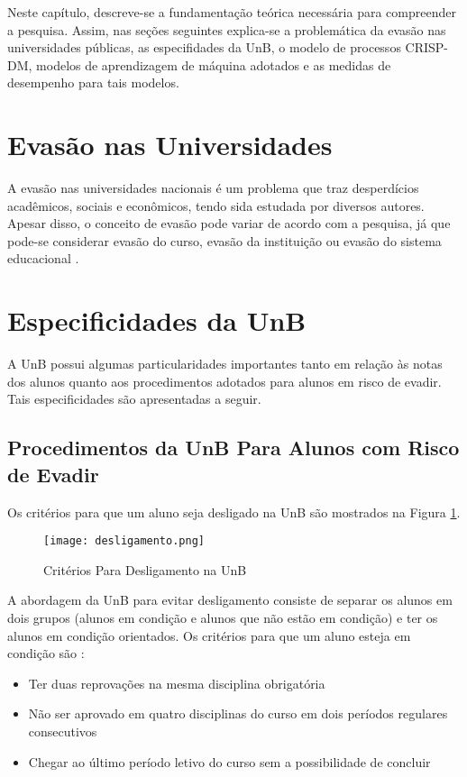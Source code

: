 Neste capítulo, descreve-se a fundamentação teórica necessária para compreender a
pesquisa. Assim, nas seções seguintes explica-se a problemática da evasão nas universidades
públicas, as especifidades da \acrshort{UnB}, o modelo de processos CRISP-DM, modelos
de aprendizagem de máquina adotados e as medidas de desempenho para tais modelos. 

\section{Evasão nas Universidades} 
A evasão nas universidades nacionais é um problema que traz desperdícios acadêmicos,
sociais e econômicos, tendo sida estudada por diversos autores. Apesar disso, o
conceito de evasão pode variar  de acordo com a pesquisa,
já que pode-se considerar evasão do curso, evasão da instituição ou evasão do
sistema educacional \cite{mec_conceito_evasao}. 

\section{Especificidades da UnB}
A UnB possui algumas particularidades importantes tanto em relação às notas dos
alunos quanto aos procedimentos adotados para alunos em risco de evadir. Tais
especificidades são apresentadas a seguir. 

\subsection{Procedimentos da UnB Para Alunos com Risco de Evadir}
\par Os critérios para que um aluno seja desligado na UnB são mostrados na Figura
\ref{desligamento}. 
\begin{figure}[!ht]
    \caption{Critérios Para Desligamento na UnB}
    \centering
    \texttt{[image: desligamento.png]}
    \label{desligamento}
\end{figure}
 
A abordagem da UnB para evitar desligamento consiste de separar os alunos em dois
grupos (alunos em condição e alunos que não estão em condição) e ter os alunos em
condição orientados. Os critérios para que um aluno esteja em condição são
\cite{manual_calouro}: 
\begin{itemize}
    \item Ter duas reprovações na mesma disciplina obrigatória
    \item Não ser aprovado em quatro disciplinas do curso em dois períodos regulares
        consecutivos
    \item Chegar ao último período letivo do curso sem a possibilidade de concluir
\end{itemize}

